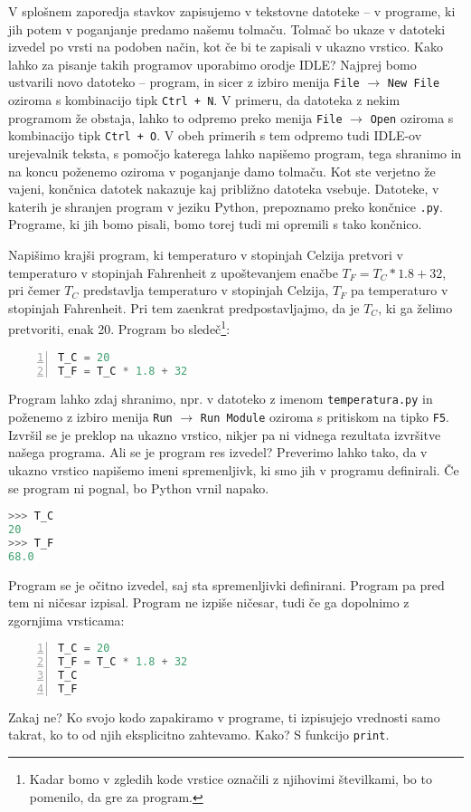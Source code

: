V splošnem zaporedja stavkov zapisujemo v tekstovne datoteke -- v programe, ki jih potem v poganjanje predamo našemu tolmaču. Tolmač bo ukaze v datoteki izvedel po vrsti na podoben način, kot če bi te zapisali v ukazno vrstico. Kako lahko za pisanje takih programov uporabimo orodje IDLE? Najprej bomo ustvarili novo datoteko -- program, in sicer z izbiro menija \texttt{File} $\rightarrow$ \texttt{New File} oziroma s kombinacijo tipk \texttt{Ctrl + N}. V primeru, da datoteka z nekim programom že obstaja, lahko to odpremo preko menija \texttt{File} $\rightarrow$ \texttt{Open} oziroma s kombinacijo tipk \texttt{Ctrl + O}. V obeh primerih s tem odpremo tudi IDLE-ov urejevalnik teksta, s pomočjo katerega lahko napišemo program, tega shranimo in na koncu poženemo oziroma v poganjanje damo tolmaču. Kot ste verjetno že vajeni, končnica datotek nakazuje kaj približno datoteka vsebuje. Datoteke, v katerih je shranjen program v jeziku Python, prepoznamo preko končnice \texttt{.py}. Programe, ki jih bomo pisali, bomo torej tudi mi opremili s tako končnico.

Napišimo krajši program, ki temperaturo v stopinjah Celzija pretvori v temperaturo v stopinjah Fahrenheit z upoštevanjem enačbe $T_F = T_C * 1.8 + 32$, pri čemer $T_C$ predstavlja temperaturo v stopinjah Celzija, $T_F$ pa temperaturo v stopinjah Fahrenheit. Pri tem zaenkrat predpostavljajmo, da je $T_C$, ki ga želimo pretvoriti, enak 20. Program bo sledeč\footnote{Kadar bomo v zgledih kode vrstice označili z njihovimi številkami, bo to pomenilo, da gre za program.}:
\begin{lstlisting}[language=Python,numbers=left]
T_C = 20
T_F = T_C * 1.8 + 32
\end{lstlisting}
Program lahko zdaj shranimo, npr. v datoteko z imenom \texttt{temperatura.py} in poženemo z izbiro menija \texttt{Run} $\rightarrow$ \texttt{Run Module} oziroma s pritiskom na tipko \texttt{F5}. Izvršil se je preklop na ukazno vrstico, nikjer pa ni vidnega rezultata izvršitve našega programa. Ali se je program res izvedel? Preverimo lahko tako, da v ukazno vrstico napišemo imeni spremenljivk, ki smo jih v programu definirali. Če se program ni pognal, bo Python vrnil napako.
\begin{lstlisting}[language=Python]
>>> T_C
20
>>> T_F
68.0
\end{lstlisting}
Program se je očitno izvedel, saj sta spremenljivki definirani. Program pa pred tem ni ničesar izpisal. Program ne izpiše ničesar, tudi če ga dopolnimo z zgornjima vrsticama:
\begin{lstlisting}[language=Python,numbers=left]
T_C = 20
T_F = T_C * 1.8 + 32
T_C
T_F
\end{lstlisting}
Zakaj ne? Ko svojo kodo zapakiramo v programe, ti izpisujejo vrednosti samo takrat, ko to od njih eksplicitno zahtevamo. Kako? S funkcijo \texttt{print}.

